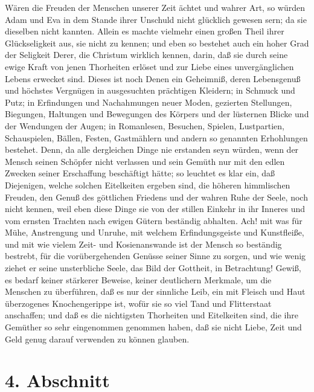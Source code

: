 Wären die Freuden der Menschen unserer Zeit ächtet und wahrer Art, so würden
Adam und Eva in dem Stande ihrer Unschuld nicht glücklich gewesen sern; da sie
dieselben nicht kannten. Allein es machte vielmehr einen großen Theil ihrer
Glückseligkeit aus, sie nicht zu kennen; und eben so bestehet auch ein hoher
Grad der Seligkeit Derer, die Christum wirklich kennen, darin, daß sie durch
seine ewige Kraft von jenen Thorheiten erlöset und zur Liebe eines
unvergänglichen Lebens erwecket sind. Dieses ist noch Denen ein Geheimniß, deren
Lebensgenuß und höchstes Vergnügen in ausgesuchten prächtigen Kleidern; in
Schmuck und Putz; in Erfindungen und Nachahmungen neuer Moden, gezierten
Stellungen, Biegungen, Haltungen und Bewegungen des Körpers und der lüsternen
Blicke und der Wendungen der Augen; in Romanlesen, Besuchen, Spielen,
Lustpartien, Schauspielen, Bällen, Festen, Gastmählern und andern so genannten
Erhohlungen bestehet. Denn, da alle dergleichen Dinge nie erstanden seyn würden,
wenn der Mensch seinen Schöpfer nicht verlassen und sein Gemüth nur mit den
edlen Zwecken seiner Erschaffung beschäftigt hätte; so leuchtet es klar ein, daß
Diejenigen, welche solchen Eitelkeiten ergeben sind, die höheren himmlischen
Freuden, den Genuß des göttlichen Friedens und der wahren Ruhe der Seele, noch
nicht kennen, weil eben diese Dinge sie von der stillen Einkehr in ihr Inneres
und vom ernsten Trachten nach ewigen Gütern beständig abhalten. Ach! mit was für
Mühe, Anstrengung und Unruhe, mit welchem Erfindungsgeiste und Kunstfleiße, und
mit wie vielem Zeit- und Kosienanswande ist der Mensch so beständig bestrebt,
für die vorübergehenden Genüsse seiner Sinne zu sorgen, und wie wenig ziehet er
seine unsterbliche Seele, das Bild der Gottheit, in Betrachtung! Gewiß, es
bedarf keiner stärkerer Beweise, keiner deutlichern Merkmale, um die Menschen zu
überführen, daß es nur der sinnliche Leib, ein mit Fleisch und Haut überzogenes
Knochengerippe ist, wofür sie so viel Tand und Flitterstaat anschaffen; und daß
es die nichtigsten Thorheiten und Eitelkeiten sind, die ihre Gemüther so sehr
eingenommen genommen haben, daß sie nicht Liebe, Zeit und Geld genug darauf
verwenden zu können glauben.

\section{4. Abschnitt} \label{kap17_ab4}

